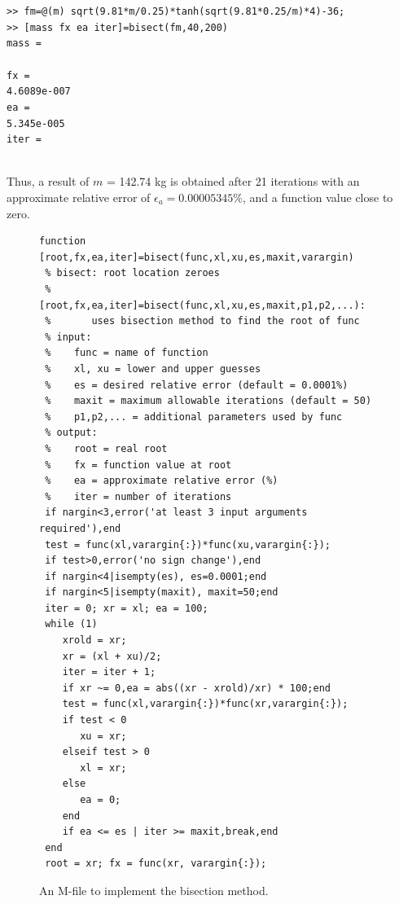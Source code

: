 \documentclass[../main.tex]{subfiles}
\begin{document}
\texttt{>> fm=@(m) sqrt(9.81*m/0.25)*tanh(sqrt(9.81*0.25/m)*4)-36;\\
\indent >> [mass fx ea iter]=bisect(fm,40,200)\\
\indent mass =\\
\indent{}\\
\indent fx =\\
\indent\indent 4.6089e-007\\
\indent ea =\\
\indent\indent 5.345e-005\\
\indent iter =\\
\indent{}\\}

\noindent Thus, a result of $m$ = 142.74 kg is obtained after 21 iterations with an approximate relative
error of $\epsilon_a = 0.00005345\%$, and a function value close to zero.

\begin{figure}[h]
    \begin{lstlisting}[numbers=none]
 function [root,fx,ea,iter]=bisect(func,xl,xu,es,maxit,varargin)
 % bisect: root location zeroes
 %    [root,fx,ea,iter]=bisect(func,xl,xu,es,maxit,p1,p2,...):
 %       uses bisection method to find the root of func
 % input:
 %    func = name of function
 %    xl, xu = lower and upper guesses
 %    es = desired relative error (default = 0.0001%)
 %    maxit = maximum allowable iterations (default = 50)
 %    p1,p2,... = additional parameters used by func
 % output:
 %    root = real root
 %    fx = function value at root
 %    ea = approximate relative error (%)
 %    iter = number of iterations
 if nargin<3,error('at least 3 input arguments required'),end
 test = func(xl,varargin{:})*func(xu,varargin{:});
 if test>0,error('no sign change'),end
 if nargin<4|isempty(es), es=0.0001;end
 if nargin<5|isempty(maxit), maxit=50;end
 iter = 0; xr = xl; ea = 100;
 while (1)
    xrold = xr;
    xr = (xl + xu)/2;
    iter = iter + 1;
    if xr ~= 0,ea = abs((xr - xrold)/xr) * 100;end
    test = func(xl,varargin{:})*func(xr,varargin{:});
    if test < 0
       xu = xr;
    elseif test > 0
       xl = xr;
    else
       ea = 0;
    end
    if ea <= es | iter >= maxit,break,end
 end
 root = xr; fx = func(xr, varargin{:});
    \end{lstlisting}
    \caption{An M-file to implement the bisection method.}
\end{figure}
\vspace{1.5 cm}

\newpage
\end{document}
